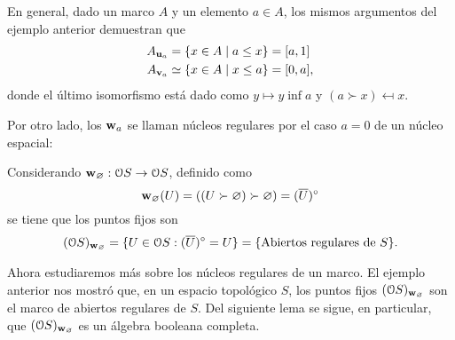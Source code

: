 \begin{example}
En general, dado un marco $A$ y un elemento $a\in A$,
los mismos argumentos del ejemplo anterior demuestran que
\begin{align*}
    A_{\mathbf u_{a}}
    &= \{x\in A\mid a\leq x\} = [a,1]\\
    A_{\mathbf v_{a}}
    &\simeq \{x\in A\mid x\leq a\} = [0,a],
\end{align*}
donde el último isomorfismo está dado como $y\mapsto y\inf a$
y $(a\succ x)\mapsfrom x$.
\end{example}

Por otro lado, los $\mathbf w_{a}$ se llaman núcleos regulares por el
caso $a=0$ de un núcleo espacial:

\begin{example}
  Considerando $\mathbf w_{\varnothing}:\mathcal{O} S\to \mathcal{O} S$, definido
  como
  \[
    \mathbf w_{\varnothing}(U)
    =((U\succ\varnothing)\succ\varnothing)
    =(\overline{U})^{\circ}
  \]
  se tiene que los puntos fijos son 
  $$(\mathcal{O}S)_{\mathbf w_{\varnothing}}
  =\{U\in \mathcal{O} S : (\overline{U})^{\circ}=U\}
  =\{\text{Abiertos regulares de }S\}.$$
\end{example}

Ahora estudiaremos más sobre los núcleos regulares de un marco.
El ejemplo anterior nos mostró que, en un espacio topológico $S$,
los puntos fijos $(\mathcal{O}S)_{\mathbf w_{\varnothing}}$ son el marco de
abiertos regulares de $S$.
Del siguiente lema se sigue, en particular, que
$(\mathcal{O}S)_{\mathbf w_{\varnothing}}$ es un álgebra booleana completa.

